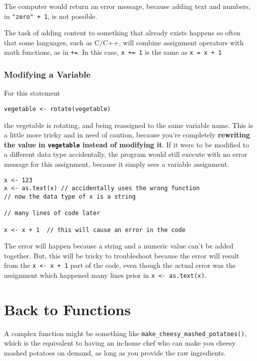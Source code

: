 \documentclass[
]{book}
\begin{document}
The computer would return an error message, because adding text and numbers, in \texttt{"zero"\ +\ 1}, is not possible.

The task of adding content to something that already exists happens so often that some languages, such as C/C++, will combine assignment operators with math functions, as in \texttt{+=}. In this case, \texttt{x\ +=\ 1} is the same as \texttt{x\ =\ x\ +\ 1}

\subsubsection{Modifying a Variable}\label{modifying-a-variable}

For this statement

\texttt{vegetable\ \textless{}-\ rotate(vegetable)}

the vegetable is rotating, and being reassigned to the same variable name. This is a little more tricky and in need of caution, because you're completely \textbf{rewriting the value in \texttt{vegetable} instead of modifying it}. If it were to be modified to a different data type accidentally, the program would still execute with no error message for this assignment, because it simply sees a variable assignment.

\begin{verbatim}
x <- 123
x <- as.text(x) // accidentally uses the wrong function
// now the data type of x is a string

// many lines of code later

x <- x + 1  // this will cause an error in the code
\end{verbatim}

The error will happen because a string and a numeric value can't be added together. But, this will be tricky to troubleshoot because the error will result from the \texttt{x\ \textless{}-\ x\ +\ 1} part of the code, even though the actual error was the assignment which happened many lines prior in \texttt{x\ \textless{}-\ as.text(x)}.

\section{Back to Functions}\label{back-to-functions}

A complex function might be something like \texttt{make\_cheesy\_mashed\_potatoes()}, which is the equivalent to having an in-home chef who can make you cheesy mashed potatoes on demand, as long as you provide the raw ingredients.
\end{document}
